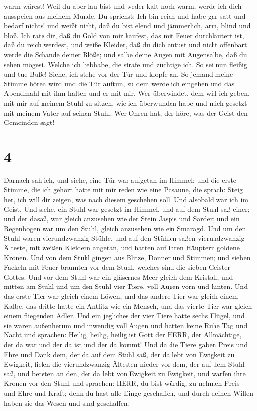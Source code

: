 warm wärest!  Weil du aber lau bist und weder kalt noch
warm, werde ich dich ausspeien aus meinem Munde.  Du
sprichst: Ich bin reich und habe gar satt und bedarf nichts! und weißt
nicht, daß du bist elend und jämmerlich, arm, blind und bloß.
 Ich rate dir, daß du Gold von mir kaufest, das mit Feuer
durchläutert ist, daß du reich werdest, und weiße Kleider, daß du dich
antust und nicht offenbart werde die Schande deiner Blöße; und salbe
deine Augen mit Augensalbe, daß du sehen mögest.  Welche
ich liebhabe, die strafe und züchtige ich. So sei nun fleißig und tue
Buße!  Siehe, ich stehe vor der Tür und klopfe an. So
jemand meine Stimme hören wird und die Tür auftun, zu dem werde ich
eingehen und das Abendmahl mit ihm halten und er mit mir. 
Wer überwindet, dem will ich geben, mit mir auf meinem Stuhl zu sitzen,
wie ich überwunden habe und mich gesetzt mit meinem Vater auf seinen
Stuhl.  Wer Ohren hat, der höre, was der Geist den
Gemeinden sagt!

\hypertarget{section-3}{%
\section{4}\label{section-3}}

 Darnach sah ich, und siehe, eine Tür war aufgetan im
Himmel; und die erste Stimme, die ich gehört hatte mit mir reden wie
eine Posaune, die sprach: Steig her, ich will dir zeigen, was nach
diesem geschehen soll.  Und alsobald war ich im Geist. Und
siehe, ein Stuhl war gesetzt im Himmel, und auf dem Stuhl saß einer;
 und der dasaß, war gleich anzusehen wie der Stein Jaspis
und Sarder; und ein Regenbogen war um den Stuhl, gleich anzusehen wie
ein Smaragd.  Und um den Stuhl waren vierundzwanzig Stühle,
und auf den Stühlen saßen vierundzwanzig Älteste, mit weißen Kleidern
angetan, und hatten auf ihren Häuptern goldene Kronen.  Und
von dem Stuhl gingen aus Blitze, Donner und Stimmen; und sieben Fackeln
mit Feuer brannten vor dem Stuhl, welches sind die sieben Geister
Gottes.  Und vor dem Stuhl war ein gläsernes Meer gleich dem
Kristall, und mitten am Stuhl und um den Stuhl vier Tiere, voll Augen
vorn und hinten.  Und das erste Tier war gleich einem Löwen,
und das andere Tier war gleich einem Kalbe, das dritte hatte ein Antlitz
wie ein Mensch, und das vierte Tier war gleich einem fliegenden Adler.
 Und ein jegliches der vier Tiere hatte sechs Flügel, und
sie waren außenherum und inwendig voll Augen und hatten keine Ruhe Tag
und Nacht und sprachen: Heilig, heilig, heilig ist Gott der HERR, der
Allmächtige, der da war und der da ist und der da kommt! 
Und da die Tiere gaben Preis und Ehre und Dank dem, der da auf dem Stuhl
saß, der da lebt von Ewigkeit zu Ewigkeit,  fielen die
vierundzwanzig Ältesten nieder vor dem, der auf dem Stuhl saß, und
beteten an den, der da lebt von Ewigkeit zu Ewigkeit, und warfen ihre
Kronen vor den Stuhl und sprachen:  HERR, du bist würdig,
zu nehmen Preis und Ehre und Kraft; denn du hast alle Dinge geschaffen,
und durch deinen Willen haben sie das Wesen und sind geschaffen.

